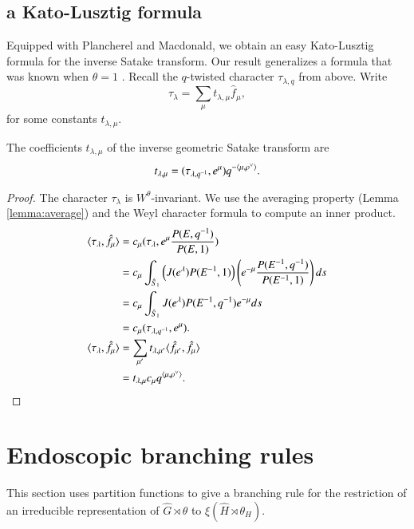 \subsection{a Kato-Lusztig formula}

Equipped with Plancherel and Macdonald, we obtain an easy Kato-Lusztig
formula for the inverse Satake transform.  Our result generalizes a
formula that was known when $\theta=1$ \cite{kato1982spherical}
\cite{lusztig1983singularities}.  Recall the $q$-twisted character
$\tau_{\lambda,q}$ from above.  Write
\[
\tau_\lambda = \sum_\mu t_{\lambda,\mu}  \hat f_\mu,
\]
for some constants $t_{\lambda,\mu}$.

\begin{theorem}
  The coefficients $t_{\lambda,\mu}$ of the inverse geometric Satake
  transform are
\[
t_{\lambda,\mu} =  (\tau_{\lambda,q^{-1}},e^\mu) q^{-\langle{\mu,\rho^\vee}\rangle}.
\]
\end{theorem}

\begin{proof}
  The character $\tau_\lambda$ is $W^\theta$-invariant.  We use the
  averaging property (Lemma \ref{lemma:average}) and the Weyl
  character formula to compute an inner product.
\begin{align*}
\langle{\tau_\lambda,\hat f_\mu}\rangle
&=c_\mu(\tau_\lambda,e^\mu \frac{P(E,q^{-1})}{P(E,1)})\\
&=c_\mu\int_{\hat S_1} \left(J(e^\lambda) P(E^{-1},1)\right) 
\left( e^{-\mu}\frac{P(E^{-1},q^{-1})}{P(E^{-1},1)} \right) ds\\
&=
c_\mu\int_{\hat S_1} J(e^\lambda) P(E^{-1},q^{-1}) e^{-\mu} ds\\
&= c_\mu(\tau_{\lambda,q^{-1}},e^\mu).\\
\langle{\tau_\lambda,\hat f_\mu}\rangle
&=\sum_{\mu'} t_{\lambda,\mu'} \langle{\hat f_{\mu'},\hat f_\mu}\rangle \\
&= t_{\lambda,\mu} c_\mu q^{\langle{\mu,\rho^\vee}\rangle}.
\end{align*}
\end{proof}


\section{Endoscopic branching rules}\label{sec:branch}

This section uses partition functions to give a branching rule for
the restriction of an irreducible representation of $\hat G\rtimes\theta$
to $\xi(\hat H\rtimes \theta_H)$.


